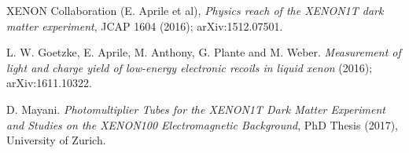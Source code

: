 \documentclass[11pt,a4paper]{article}
\begin{document}
\begin{thebibliography}{24}
XENON Collaboration (E. Aprile et al), \textit{Physics reach of the XENON1T dark matter experiment}, JCAP 1604 (2016); arXiv:1512.07501.
 
L. W. Goetzke, E. Aprile, M. Anthony, G. Plante and M. Weber.  \textit{Measurement of light and charge yield of low-energy electronic recoils in liquid xenon} (2016);
arXiv:1611.10322.


D. Mayani. \textit{Photomultiplier Tubes for the XENON1T Dark Matter Experiment and Studies on the XENON100 Electromagnetic Background}, PhD Thesis (2017), University of Zurich.

\end{thebibliography}
\end{document}
